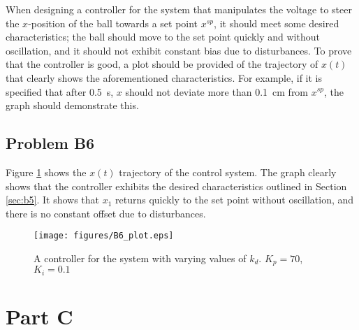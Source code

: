 \documentclass[a4paper,10pt,reqno]{amsart}
\numberwithin{equation}{section}
\begin{document}
When designing a controller for the system that manipulates the voltage to steer the $x$-position of the ball towards a set point $x^{sp}$, it should meet some desired characteristics; the ball should move to the set point quickly and without oscillation, and it should not exhibit constant bias due to disturbances. To prove that the controller is good, a plot should be provided of the trajectory of $x(t)$ that clearly shows the aforementioned characteristics. For example, if it is specified that after 0.5~s, $x$ should not deviate more than 0.1~cm from $x^{sp}$, the graph should demonstrate this.

\subsection{Problem B6} Figure \ref{fig:B6_plot} shows the $x(t)$ trajectory of the control system. The graph clearly shows that the controller exhibits the desired characteristics outlined in Section \ref{sec:b5}. It shows that $x_1$ returns quickly to the set point without oscillation, and there is no constant offset due to disturbances.

\begin{figure}[h]
     \texttt{[image: figures/B6\_plot.eps]}
     \caption{A controller for the system with varying values of $k_d$. $K_p = 70$, $K_i = 0.1$}
     \label{fig:B6_plot}
\end{figure}


\section{Part C}
\end{document}
